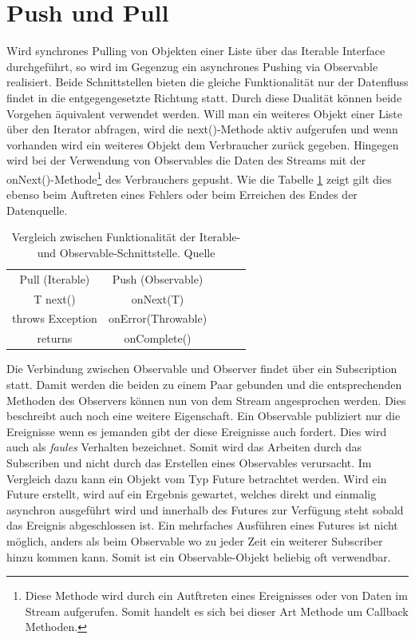 \section{Push und Pull}
Wird synchrones Pulling von Objekten einer Liste über das Iterable Interface durchgeführt, so wird im Gegenzug ein asynchrones Pushing via Observable realisiert. Beide Schnittstellen bieten die gleiche Funktionalität nur der Datenfluss findet in die entgegengesetzte Richtung statt. Durch diese Dualität können beide Vorgehen äquivalent verwendet werden. Will man ein weiteres Objekt einer Liste über den Iterator abfragen, wird die next()-Methode aktiv aufgerufen und wenn vorhanden wird ein weiteres Objekt dem Verbraucher zurück gegeben. Hingegen wird bei der Verwendung von Observables die Daten des Streams mit der onNext()-Methode\footnote{Diese Methode wird durch ein Autftreten eines Ereignisses oder von Daten im Stream aufgerufen. Somit handelt es sich bei dieser Art Methode um Callback Methoden.} des Verbrauchers gepusht. Wie die Tabelle \ref{tbl:vglIterObs} zeigt gilt dies ebenso beim Auftreten eines Fehlers oder beim Erreichen des Endes der Datenquelle.
\begin{table}[]
	\centering
	\begin{tabular}{|c|c|lll}
		\cline{1-2}
		\cellcolor[HTML]{C0C0C0}Pull (Iterable) & \cellcolor[HTML]{C0C0C0}Push (Observable) &  &  &  \\ \cline{1-2}
		T next()                                & onNext(T)                                 &  &  &  \\ \cline{1-2}
		throws Exception                        & onError(Throwable)                        &  &  &  \\ \cline{1-2}
		returns                                 & onComplete()                             &  &  &  \\ \cline{1-2}
	\end{tabular}
	\caption{Vergleich zwischen Funktionalität der Iterable- und Observable-Schnittstelle. Quelle \cite{mainrxapi}}
	\label{tbl:vglIterObs}
\end{table}
Die Verbindung zwischen Observable und Observer findet über ein Subscription statt. Damit werden die beiden zu einem Paar gebunden und die entsprechenden Methoden des Observers können nun von dem Stream angesprochen werden. Dies beschreibt auch noch eine weitere Eigenschaft. Ein Observable publiziert nur die Ereignisse wenn es jemanden gibt der diese Ereignisse auch fordert. Dies wird auch als \textit{faules} Verhalten bezeichnet. Somit wird das Arbeiten durch das Subscriben und nicht durch das Erstellen eines Observables verursacht. Im Vergleich dazu kann ein Objekt vom Typ Future betrachtet werden. Wird ein Future erstellt, wird auf ein Ergebnis gewartet, welches direkt und einmalig asynchron ausgeführt wird und innerhalb des Futures zur Verfügung steht sobald das Ereignis abgeschlossen ist. Ein mehrfaches Ausführen eines Futures ist nicht möglich, anders als beim Observable wo zu jeder Zeit ein weiterer Subscriber hinzu kommen kann. Somit ist ein Observable-Objekt beliebig oft verwendbar. 
